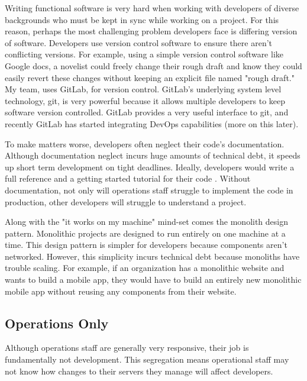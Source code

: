 \documentclass[titlepage]{article}
\begin{document}
Writing functional software is very hard when working with developers of diverse backgrounds who must be kept in sync while working on a project. For this reason, perhaps the most challenging problem developers face is differing version of software. Developers use version control software to ensure there aren’t conflicting versions. For example, using a simple version control software like Google docs, a novelist could freely change their rough draft and know they could easily revert these changes without keeping an explicit file named "rough draft." My team, uses GitLab, for version control. GitLab's underlying system level technology, git, is very powerful because it allows multiple developers to keep software version controlled. GitLab provides a very useful interface to git, and recently GitLab has started integrating DevOps capabilities (more on this later).

To make matters worse, developers often neglect their code's documentation. Although documentation neglect incurs huge amounts of technical debt, it speeds up short term development on tight deadlines. Ideally, developers would write a full reference and a getting started tutorial for their code \cite{Dagenais:2010:CED:1882291.1882312}. Without documentation, not only will operations staff struggle to implement the code in production, other developers will struggle to understand a project. 

Along with the "it works on my machine" mind-set comes the monolith design pattern. Monolithic projects are designed to run entirely on one machine at a time. This design pattern is simpler for developers because components aren't networked. However, this simplicity incurs technical debt because monoliths have trouble scaling. For example, if an organization has a monolithic website and wants to build a mobile app, they would have to build an entirely new monolithic mobile app without reusing any components from their website.

\subsection{Operations Only}

Although operations staff are generally very responsive, their job is fundamentally not development. This segregation means operational staff may not know how changes to their servers they manage will affect developers.
\end{document}
